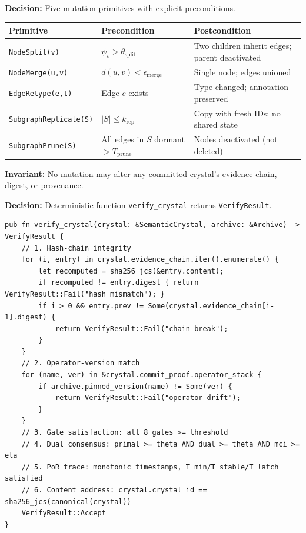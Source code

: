 \documentclass[10pt,a4paper]{article}
\theoremstyle{definition}\newtheorem{definition}{Def}[section]
\theoremstyle{plain}\newtheorem{theorem}{Thm}[section]
\newcommand{\ty}[1]{\texttt{\small\color{accent}#1}}
\newcommand{\func}[1]{\texttt{\small\color{success}#1}}
\begin{document}
\begin{resolvebox}
\textbf{Decision:} Five mutation primitives with explicit preconditions.

\begin{tabular}{l l l}
\toprule
\textbf{Primitive} & \textbf{Precondition} & \textbf{Postcondition} \\
\midrule
\texttt{NodeSplit(v)} & $\psi_v > \theta_{\text{split}}$ & Two children inherit edges; parent deactivated \\
\texttt{NodeMerge(u,v)} & $d(u,v) < \epsilon_{\text{merge}}$ & Single node; edges unioned \\
\texttt{EdgeRetype(e,t)} & Edge $e$ exists & Type changed; annotation preserved \\
\texttt{SubgraphReplicate(S)} & $|S| \leq k_{\text{rep}}$ & Copy with fresh IDs; no shared state \\
\texttt{SubgraphPrune(S)} & All edges in $S$ dormant $> T_{\text{prune}}$ & Nodes deactivated (not deleted) \\
\bottomrule
\end{tabular}

\textbf{Invariant:} No mutation may alter any committed crystal's evidence chain, digest, or provenance.
\end{resolvebox}

\begin{resolvebox}
\textbf{Decision:} Deterministic function \func{verify\_crystal} returns \ty{VerifyResult}.
\begin{lstlisting}[style=rust]
pub fn verify_crystal(crystal: &SemanticCrystal, archive: &Archive) -> VerifyResult {
    // 1. Hash-chain integrity
    for (i, entry) in crystal.evidence_chain.iter().enumerate() {
        let recomputed = sha256_jcs(&entry.content);
        if recomputed != entry.digest { return VerifyResult::Fail("hash mismatch"); }
        if i > 0 && entry.prev != Some(crystal.evidence_chain[i-1].digest) {
            return VerifyResult::Fail("chain break");
        }
    }
    // 2. Operator-version match
    for (name, ver) in &crystal.commit_proof.operator_stack {
        if archive.pinned_version(name) != Some(ver) {
            return VerifyResult::Fail("operator drift");
        }
    }
    // 3. Gate satisfaction: all 8 gates >= threshold
    // 4. Dual consensus: primal >= theta AND dual >= theta AND mci >= eta
    // 5. PoR trace: monotonic timestamps, T_min/T_stable/T_latch satisfied
    // 6. Content address: crystal.crystal_id == sha256_jcs(canonical(crystal))
    VerifyResult::Accept
}
\end{lstlisting}
\end{resolvebox}
\end{document}
